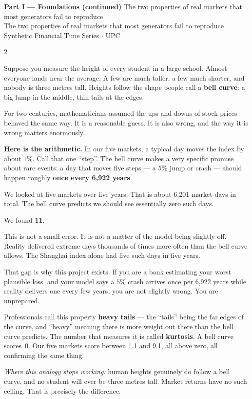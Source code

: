 \documentclass[10pt]{article}
\newcommand{\redbox}[2]{\begin{tcolorbox}[mybox={DRed}{RBg},title={#1}]#2\end{tcolorbox}}
\newcommand{\pagehead}[2]{%
  \begin{tcolorbox}[enhanced,arc=0pt,outer arc=0pt,boxrule=0pt,
    colback=Navy,colframe=Navy,
    top=5pt,bottom=5pt,left=8pt,right=8pt,
    before skip=0pt,after skip=10pt]
  {\color{white}\large\bfseries #1}%
  \ifx\relax#2\relax\else\\[1pt]{\color{blue!30!white}\small #2}\fi
  \hfill{\color{blue!20!white}\footnotesize Synthetic Financial Time Series $\cdot$ UPC}
  \end{tcolorbox}}
\begin{document}
\clearpage

\pagehead{Part I --- Foundations (continued)}
         {The two properties of real markets that most generators fail to reproduce}

\begin{multicols}{2}

\redbox{3\quad The Bell Curve Fails}{%
Suppose you measure the height of every student in a large school. Almost everyone lands near the average. A few are much taller, a few much shorter, and nobody is three metres tall. Heights follow the shape people call a \textbf{bell curve}: a big lump in the middle, thin tails at the edges.

For two centuries, mathematicians assumed the ups and downs of stock prices behaved the same way. It is a reasonable guess. It is also wrong, and the way it is wrong matters enormously.

\medskip
\textbf{Here is the arithmetic.} In our five markets, a typical day moves the index by about $1\%$. Call that one ``step''. The bell curve makes a very specific promise about rare events: a day that moves five steps --- a $5\%$ jump or crash --- should happen roughly \textbf{once every 6,922 years}.

We looked at five markets over five years. That is about 6,201 market-days in total. The bell curve predicts we should see essentially zero such days.

\medskip
We found \textbf{11}.

\medskip
This is not a small error. It is not a matter of the model being slightly off. Reality delivered extreme days thousands of times more often than the bell curve allows. The Shanghai index alone had five such days in five years.

That gap is why this project exists. If you are a bank estimating your worst plausible loss, and your model says a $5\%$ crash arrives once per 6,922 years while reality delivers one every few years, you are not slightly wrong. You are unprepared.

Professionals call this property \textbf{heavy tails} --- the ``tails'' being the far edges of the curve, and ``heavy'' meaning there is more weight out there than the bell curve predicts. The number that measures it is called \textbf{kurtosis}. A bell curve scores~0. Our five markets score between 1.1 and 9.1, all above zero, all confirming the same thing.

\smallskip
\textit{Where this analogy stops working:} human heights genuinely do follow a bell curve, and no student will ever be three metres tall. Market returns have no such ceiling. That is precisely the difference.}


\end{multicols}
\end{document}
